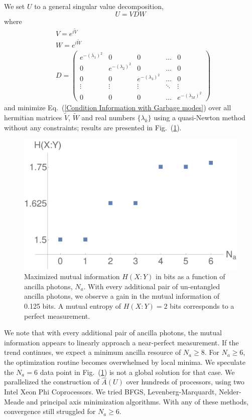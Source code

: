 \documentclass[aps,pra,twocolumn,showpacs,superscriptaddress,floatfix,10pt]{revtex4}
\begin{document}
We set $U$ to a general singular value decomposition,
\begin{equation}
	\label{Singular Value Decomposition}
	U = V D W
\end{equation}
where
\begin{eqnarray}
	& V = e^{i \tilde{V}} \\
	& W = e^{i \tilde{W}} \\
	& D =  \begin{pmatrix} e^{-(\lambda_1)^2} & 0 & 0 & \hdots & 0 \\ 0 & e^{-(\lambda_2)^2} & 0 & \hdots & 0 \\ 0 & 0 & e^{-(\lambda_3)^2} & \hdots & 0 \\ \vdots
	& \vdots & \vdots & \ddots & \vdots \\
	0 & 0 & 0 & \hdots & e^{-(\lambda_M)^2} \end{pmatrix} 
\end{eqnarray}
and minimize Eq.~(\ref{Condition Information with Garbage modes}) over all hermitian matrices $\tilde{V}$, $\tilde{W}$ and real numbers $\{\lambda_k\}$ using a quasi-Newton method without any constraints; results are presented in Fig.~(\ref{Mutual Information Results}).
\begin{figure}[ht]
	\centering
	\includegraphics[width= 0.48 \textwidth]{./EntropyData.pdf}
	\caption{ Maximized mutual information $H(X:Y)$ in bits as a function of ancilla photons, $N_a$. With every additional pair of un-entangled ancilla photons, we observe a gain in the mutual information of 0.125 bits. A mutual entropy of $H(X:Y) = 2$ bits corresponds to a perfect measurement.}
	\label{Mutual Information Results}
\end{figure}
We note that with every additional pair of ancilla photons, the mutual information appears to linearly approach a near-perfect measurement. If the trend continues, we expect a minimum ancilla resource of $N_a \ge 8$. For $N_a \ge 6$, the optimization routine becomes overwhelmed by local minima. We speculate the $N_a=6$ data point in Fig.~(\ref{Mutual Information Results}) is not a global solution for that case. We parallelized the construction of $\hat{A}(U)$ over hundreds of processors, using two Intel Xeon Phi Coprocessors. We tried BFGS, Levenberg-Marquardt, Nelder-Meade and principal axis minimization algorithms. With any of these methods, convergence still struggled for $N_a \ge 6$.
\end{document}
